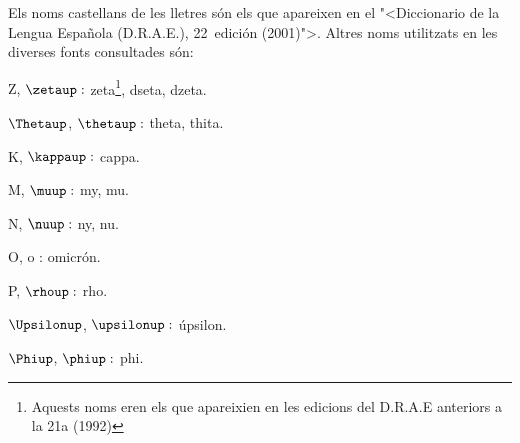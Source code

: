 Els noms castellans de les lletres s\'{o}n els que apareixen en el
{"<}Diccionario de la Lengua Espa\~{n}ola (D.R.A.E.), 22\textordfeminine\
edici\'{o}n (2001){">}. Altres noms utilitzats en les diverses fonts
consultades s\'{o}n:
\begin{multicols}{3}
\begin{list}{}
   {\setlength{\labelwidth}{16mm} \setlength{\leftmargin}{16mm} \setlength{\labelsep}{2mm}}
   \item[Z, $\zetaup :$] zeta\footnote{Aquests noms eren els que apareixien en les edicions
   del D.R.A.E anteriors a la 21a (1992)}, dseta, dzeta.
   \item[$\Thetaup$, $\thetaup :$] theta\footnotemark[1], thita.
   \item[K, $\kappaup :$] cappa.
   \item[M, $\muup :$] my\footnotemark[1], mu.
   \item[N, $\nuup :$] ny\footnotemark[1], nu.
   \item[O, o :] omicr\'{o}n.
   \item[P, $\rhoup :$] rho.
   \item[$\Upsilonup$, $\upsilonup :$] \'{u}psilon.
   \item[$\Phiup$, $\phiup :$] phi.
\end{list}
\end{multicols}
